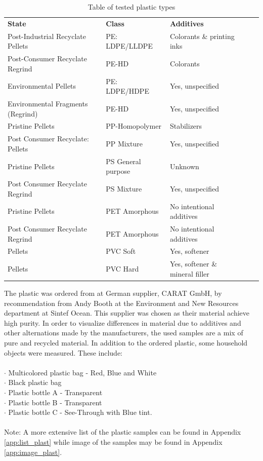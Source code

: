 \begin{center}
\begin{table}[H]
\begin{tabular}{ |l|l|l|l|l| }
 \hline
 \textbf{State} & \textbf{Class} & \textbf{Additives}\\ 
Post-Industrial Recyclate Pellets & PE: LDPE/LLDPE & Colorants \& printing inks\\
Post-Consumer Recyclate Regrind & PE-HD & Colorants\\
Environmental Pellets & PE: LDPE/HDPE & Yes, unspecified\\
Environmental Fragments (Regrind) & PE-HD & Yes, unspecified\\
Pristine Pellets & PP-Homopolymer & Stabilizers\\
Post Consumer Recyclate: Pellets & PP Mixture & Yes, unspecified\\
Pristine Pellets & PS General purpose & Unknown\\
Post Consumer Recyclate Regrind & PS Mixture & Yes, unspecified\\ 
Pristine Pellets & PET Amorphous & No intentional additives\\
Post Consumer Recyclate Regrind & PET Amorphous & No intentional additives\\
Pellets & PVC Soft & Yes, softener\\
Pellets & PVC Hard & Yes, softener \& mineral filler\\
 \hline
\end{tabular}
\caption{Table of tested plastic types}
\label{tab:tested:plastic}
\end{table}
\end{center}
\noindent
The plastic was ordered from at German supplier, CARAT GmbH, by recommendation from Andy Booth at the Environment and New Resources department at Sintef Ocean. This supplier was chosen as their material achieve high purity. In order to visualize differences in material due to additives and other alternations made by the manufacturers, the used samples are a mix of pure and recycled material. In addition to the ordered plastic, some household objects were measured. These include:
\\\\
\noindent
$\cdot$ Multicolored plastic bag - Red, Blue and White\\
$\cdot$ Black plastic bag\\
$\cdot$ Plastic bottle A - Transparent\\
$\cdot$ Plastic bottle B - Transparent\\
$\cdot$ Plastic bottle C - See-Through with Blue tint.
\\\\
Note: A more extensive list of the plastic samples can be found in Appendix \autoref{app:list_plast} while image of the samples may be found in Appendix \autoref{app:image_plast}.


